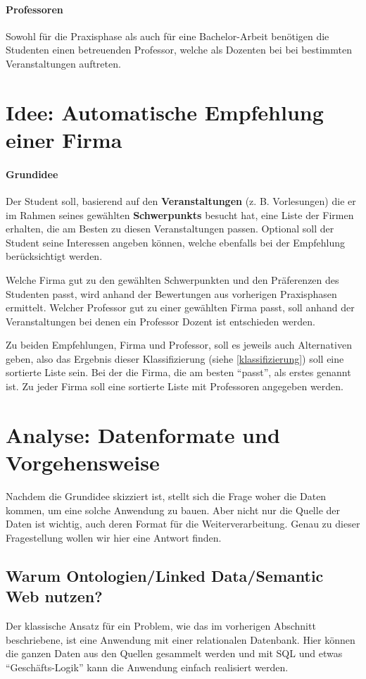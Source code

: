 \paragraph{Professoren}
Sowohl für die Praxisphase als auch für eine Bachelor-Arbeit benötigen die Studenten einen betreuenden Professor, welche als Dozenten bei bei bestimmten Veranstaltungen auftreten.

\section{Idee: Automatische Empfehlung einer Firma}
\label{sec-idee-projekt}
\paragraph{Grundidee} Der Student soll, basierend auf den \textbf{Veranstaltungen} (z. B. Vorlesungen) die er im Rahmen seines gewählten \textbf{Schwerpunkts} besucht hat, eine Liste der Firmen erhalten, die am Besten zu diesen Veranstaltungen passen. Optional soll der Student seine Interessen angeben können, welche ebenfalls bei der Empfehlung berücksichtigt werden.

Welche Firma gut zu den gewählten Schwerpunkten und den Präferenzen des Studenten passt, wird anhand der Bewertungen aus vorherigen Praxisphasen ermittelt. Welcher Professor gut zu einer gewählten Firma passt, soll anhand der Veranstaltungen bei denen ein Professor Dozent ist entschieden werden.

Zu beiden Empfehlungen, Firma und Professor, soll es jeweils auch Alternativen geben, also das Ergebnis dieser Klassifizierung (siehe \ref{klassifizierung}) soll eine sortierte Liste sein. Bei der die Firma, die am besten ``passt'', als erstes genannt ist. Zu jeder Firma soll eine sortierte Liste mit Professoren angegeben werden.

\section{Analyse: Datenformate und Vorgehensweise} %
\label{sec-analyse-daten}
Nachdem die Grundidee skizziert ist, stellt sich die Frage woher die Daten kommen, um eine solche Anwendung zu bauen. Aber nicht nur die Quelle der Daten ist wichtig, auch deren Format für die Weiterverarbeitung. Genau zu dieser Fragestellung wollen wir hier eine Antwort finden.

\subsection{Warum Ontologien/Linked Data/Semantic Web nutzen?}
Der klassische Ansatz für ein Problem, wie das im vorherigen Abschnitt beschriebene, ist eine Anwendung mit einer relationalen Datenbank. Hier können die ganzen Daten aus den Quellen gesammelt werden und mit SQL und etwas ``Geschäfts-Logik'' kann die Anwendung einfach realisiert werden.

